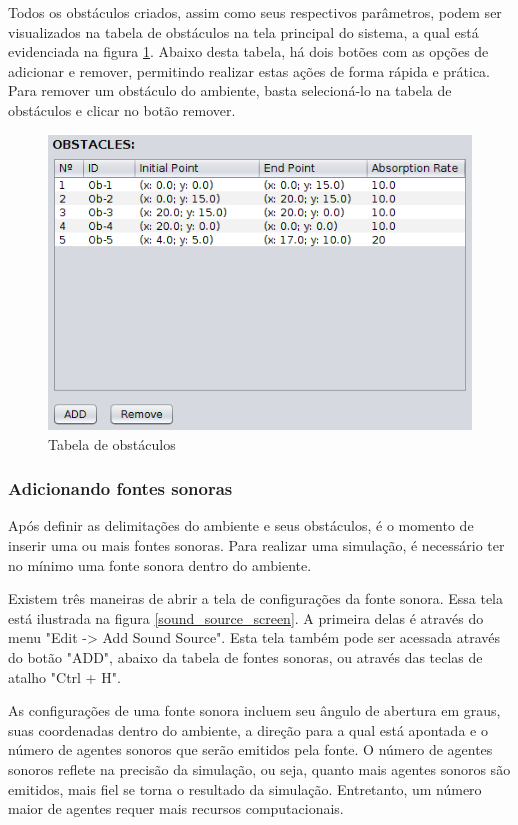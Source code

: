 Todos os obstáculos criados, assim como seus respectivos parâmetros, podem ser visualizados na tabela de obstáculos na tela principal do sistema, a qual está evidenciada na figura \ref{tabela_obstaculos}. Abaixo desta tabela, há dois botões com as opções de adicionar e remover, permitindo realizar estas ações de forma rápida e prática. Para remover um obstáculo do ambiente, basta selecioná-lo na tabela de obstáculos e clicar no botão remover.

\begin{figure}[!htb]
\centering
\includegraphics[scale=0.6]{figuras/telas/obstacles_table}
\caption{Tabela de obstáculos}
\label{tabela_obstaculos}
\end{figure}

\subsubsection{Adicionando fontes sonoras}

Após definir as delimitações do ambiente e seus obstáculos, é o momento de inserir uma ou mais fontes sonoras. Para realizar uma simulação, é necessário ter no mínimo uma fonte sonora dentro do ambiente.

Existem três maneiras de abrir a tela de configurações da fonte sonora. Essa tela está ilustrada na figura \ref{sound_source_screen}. A primeira delas é através do menu "Edit -> Add Sound Source". Esta tela também pode ser acessada através do botão "ADD", abaixo da tabela de fontes sonoras, ou através das teclas de atalho "Ctrl + H".

As configurações de uma fonte sonora incluem seu ângulo de abertura em graus, suas coordenadas dentro do ambiente, a direção para a qual está apontada e o número de agentes sonoros que serão emitidos pela fonte. O número de agentes sonoros reflete na precisão da simulação, ou seja, quanto mais agentes sonoros são emitidos, mais fiel se torna o resultado da simulação. Entretanto, um número maior de agentes requer mais recursos computacionais.

